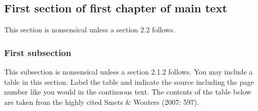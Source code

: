\documentclass[11pt,a4paper]{article}
\begin{document}
\subsection{First section of first chapter of main text}
This section is nonsensical unless a section 2.2 follows.

\subsubsection{First subsection}
This subsection is nonsensical unless a section 2.1.2 follows. You may include a table in this section. Label the table and indicate the source including the page number like you would in the continuous text. The contents of the table below are taken from the highly cited Smets \& Wouters (2007: 597).
\begin{table}[H]
	\centering
	\caption[Example table (short description)]{An example table. Describe it shortly. Source: Smets \& Wouters (2007): 597.}
\end{table}
\newpage
\end{document}
